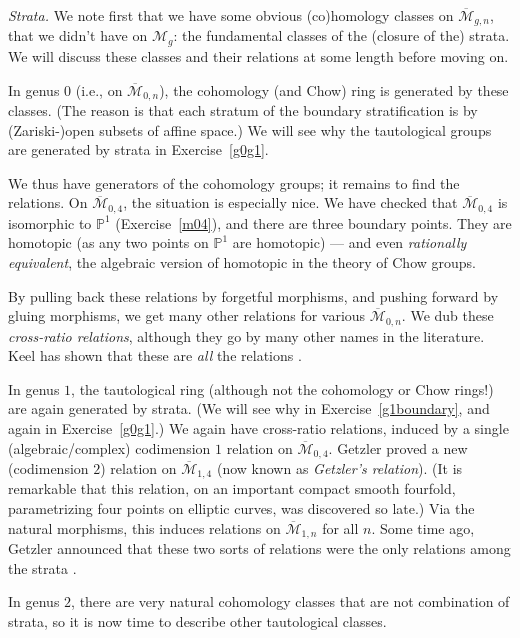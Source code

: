 \documentclass[12pt,letterpaper]{amsart}
\newcommand{\epoint}[1]{\vspace{3mm}\par \noindent \refstepcounter{subsection}{\bf \thesubsection.} 
  {\em #1.} }
\newcommand{\proj}{\mathbb P}
\newcommand{\cm}{{\mathcal{M}}}
\newcommand{\cmbar}{\overline{\cm}}
\newcommand{\lremind}[1]{{\bf[label:  #1]}}
\renewcommand{\lremind}[1]{{}}
\begin{document}
{\epoint{Strata} We note first that we have some obvious (co)homology
classes on $\cmbar_{g,n}$, that we didn't have on $\cm_g$: the
fundamental classes of the (closure of the) strata.  We will discuss
these classes and their relations at some length before moving on.

In genus $0$ (i.e., on $\cmbar_{0,n}$), the cohomology (and Chow) ring
is generated by these classes.  (The reason is that each stratum of
the boundary stratification is by (Zariski-)open subsets of affine
space.)  We will see why the tautological groups are generated by
strata in Exercise~\ref{g0g1}.

We thus have generators of the cohomology groups; it remains to find
the relations.  On $\cmbar_{0,4}$, the situation is especially nice.
We have checked that $\cmbar_{0,4}$ is isomorphic to $\proj^1$
(Exercise~\ref{m04}), and there are three boundary points.  They are
homotopic (as any two points on $\proj^1$ are homotopic) --- and even
{\em rationally equivalent}, the algebraic version of homotopic in the
theory of Chow groups.

By pulling back these relations by forgetful morphisms, and pushing
forward by gluing morphisms, we get many other relations for various
$\cmbar_{0,n}$.  We dub these {\em cross-ratio relations}, although
they go by many other names in the literature.  Keel has shown that
these are {\em all} the relations
\cite{keel}.\label{g0relns}\lremind{g0relns}

In genus $1$, the tautological ring (although not the cohomology or
Chow rings!) are again generated by strata.  (We will see why in
Exercise~\ref{g1boundary}, and again in Exercise~\ref{g0g1}.)\label{g1promise}\lremind{g1promise} We
again have cross-ratio relations, induced by a single
(algebraic/complex) codimension $1$ relation on $\cmbar_{0,4}$.
Getzler proved a new (codimension $2$) relation on $\cmbar_{1,4}$
\cite[Thm.~1.8]{getzler} (now known as {\em Getzler's relation}).  (It is
remarkable that this relation, on an important compact smooth
fourfold, parametrizing four points on elliptic curves, was discovered
so late.)  Via the natural morphisms, this induces relations on
$\cmbar_{1,n}$ for all $n$.  Some time ago, Getzler announced that
these two sorts of relations were the only relations among the strata
\cite[par.~2]{getzler}.

In genus $2$, there are very natural cohomology classes that are not
combination of strata, so it is now time to describe other
tautological classes.

}
\end{document}
